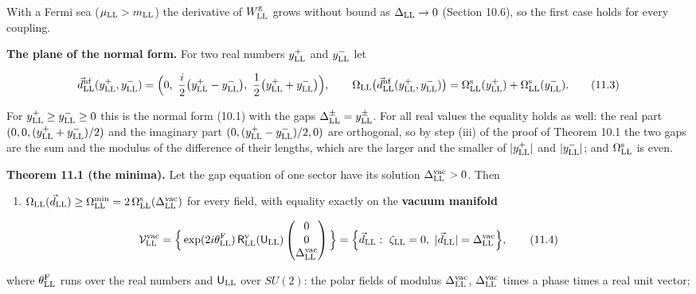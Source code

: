 \documentclass[
  10pt,
]{article}
\providecommand{\tightlist}{%
  \setlength{\itemsep}{0pt}\setlength{\parskip}{0pt}}
\begin{document}
With a Fermi sea (\(\mu_{\rm LL}>m_{\rm LL}\)) the derivative of
\(W^{\rm g}_{\rm LL}\) grows without bound as \(\Delta_{\rm LL}\to0\)
(Section 10.6), so the first case holds for every coupling.

\textbf{The plane of the normal form.} For two real numbers
\(y^+_{\rm LL}\) and \(y^-_{\rm LL}\) let

\[\vec d^{\rm nf}_{\rm LL}(y^+_{\rm LL},y^-_{\rm LL})=\Big(0,\ \frac i2\big(y^+_{\rm LL}-y^-_{\rm LL}\big),\ \frac12\big(y^+_{\rm LL}+y^-_{\rm LL}\big)\Big),\qquad\Omega_{\rm LL}\big(\vec d^{\rm nf}_{\rm LL}(y^+_{\rm LL},y^-_{\rm LL})\big)=\Omega^{\rm s}_{\rm LL}(y^+_{\rm LL})+\Omega^{\rm s}_{\rm LL}(y^-_{\rm LL}).\tag{11.3}\]

For \(y^+_{\rm LL}\ge y^-_{\rm LL}\ge0\) this is the normal form (10.1)
with the gaps \(\Delta^\pm_{\rm LL}=y^\pm_{\rm LL}\). For all real
values the equality holds as well: the real part
\((0,0,(y^+_{\rm LL}+y^-_{\rm LL})/2)\) and the imaginary part
\((0,(y^+_{\rm LL}-y^-_{\rm LL})/2,0)\) are orthogonal, so by step (iii)
of the proof of Theorem 10.1 the two gaps are the sum and the modulus of
the difference of their lengths, which are the larger and the smaller of
\(\lvert y^+_{\rm LL}\rvert\) and \(\lvert y^-_{\rm LL}\rvert\); and
\(\Omega^{\rm s}_{\rm LL}\) is even.

\textbf{Theorem 11.1 (the minima).} Let the gap equation of one sector
have its solution \(\Delta^{\rm vac}_{\rm LL}>0\). Then

\begin{enumerate}
\def\labelenumi{(\roman{enumi})}
\tightlist
\item
  \(\Omega_{\rm LL}(\vec d_{\rm LL})\ge\Omega^{\rm min}_{\rm LL}=2\,\Omega^{\rm s}_{\rm LL}(\Delta^{\rm vac}_{\rm LL})\)
  for every field, with equality exactly on the \textbf{vacuum manifold}
\end{enumerate}

\[\mathcal V^{\rm vac}_{\rm LL}=\Big\{\exp(2i\theta^{\rm F}_{\rm LL})\,\mathsf R^{\rm v}_{\rm LL}(\mathsf U_{\rm LL})\begin{pmatrix}0\\0\\\Delta^{\rm vac}_{\rm LL}\end{pmatrix}\Big\}=\Big\{\vec d_{\rm LL}:\ \zeta_{\rm LL}=0,\ \lvert\vec d_{\rm LL}\rvert=\Delta^{\rm vac}_{\rm LL}\Big\},\tag{11.4}\]

where \(\theta^{\rm F}_{\rm LL}\) runs over the real numbers and
\(\mathsf U_{\rm LL}\) over \(SU(2)\): the polar fields of modulus
\(\Delta^{\rm vac}_{\rm LL}\), \(\Delta^{\rm vac}_{\rm LL}\) times a
phase times a real unit vector;
\end{document}
